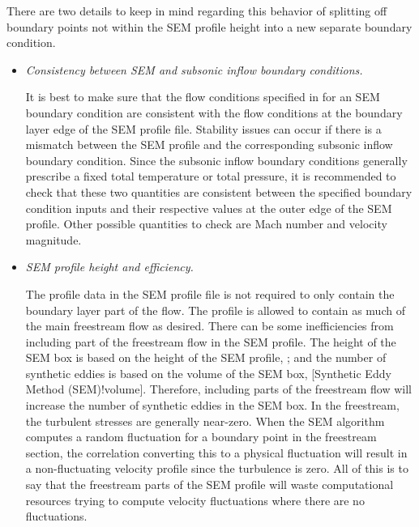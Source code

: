 There are two details to keep in mind regarding this behavior of splitting off
boundary points not within the SEM profile height into a new separate boundary
condition.
%
\begin{itemize}
  \item \textit{Consistency between SEM and subsonic inflow boundary
    conditions.}

    It is best to make sure that the flow conditions specified in
    for an SEM boundary condition are consistent with the flow
    conditions at the boundary layer edge of the SEM profile file.
    Stability issues can occur if there is a mismatch between the SEM profile
    and the corresponding subsonic inflow boundary condition.
    Since the subsonic inflow boundary conditions generally prescribe a fixed
    total temperature or total pressure, it is recommended to check that these
    two quantities are consistent between the specified boundary condition
    inputs and their respective values at the outer edge of the SEM profile.
    Other possible quantities to check are Mach number and velocity magnitude.
  \item \textit{SEM profile height and efficiency.}

    The profile data in the SEM profile file is not required to only contain the
    boundary layer part of the flow.
    The profile is allowed to contain as much of the main freestream flow as
    desired.
    There can be some inefficiencies from including part of the freestream flow
    in the SEM profile.
    The height of the SEM box is based on the height of the SEM profile, \hSEM;
    and the number of synthetic eddies is based on the volume of the SEM box,
    [Synthetic Eddy Method (SEM)!volume].
    Therefore, including parts of the freestream flow will increase the
    number of synthetic eddies in the SEM box.
    In the freestream, the turbulent stresses are generally near-zero.
    When the SEM algorithm computes a random fluctuation for a boundary point in
    the freestream section, the correlation converting this to a physical
    fluctuation will result in a non-fluctuating velocity profile since the
    turbulence is zero.
    All of this is to say that the freestream parts of the SEM profile will
    waste computational resources trying to compute velocity fluctuations where
    there are no fluctuations.


\end{itemize}
